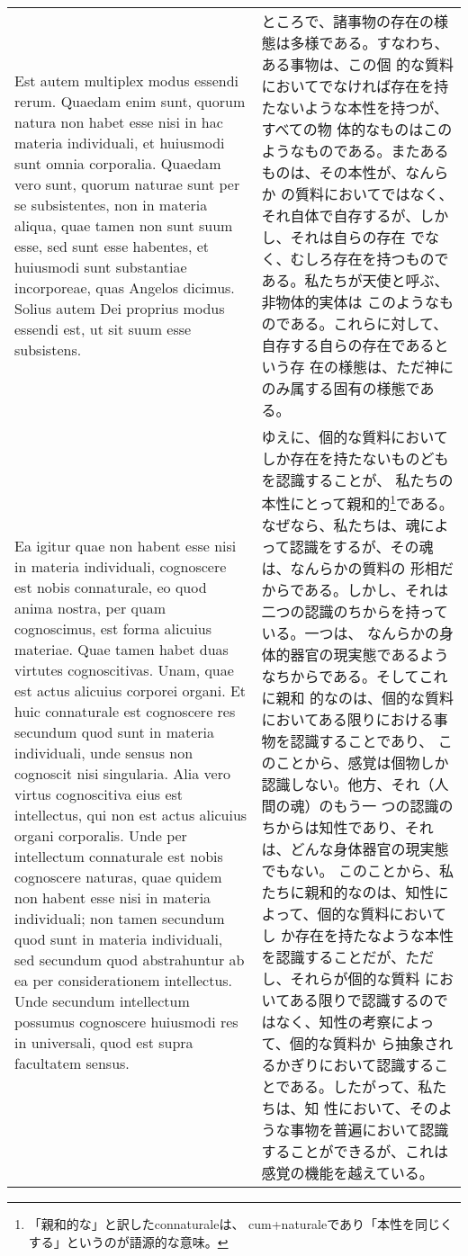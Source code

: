 \documentclass[10pt]{jsarticle} %
\begin{document}
\begin{longtable}{p{21em}p{21em}}
\\

Est autem multiplex modus essendi rerum. Quaedam enim sunt, quorum
natura non habet esse nisi in hac materia individuali, et huiusmodi
sunt omnia corporalia. Quaedam vero sunt, quorum naturae sunt per se
subsistentes, non in materia aliqua, quae tamen non sunt suum esse,
sed sunt esse habentes, et huiusmodi sunt substantiae incorporeae,
quas Angelos dicimus. Solius autem Dei proprius modus essendi est, ut
sit suum esse subsistens.

&

ところで、諸事物の存在の様態は多様である。すなわち、ある事物は、この個
的な質料においてでなければ存在を持たないような本性を持つが、すべての物
体的なものはこのようなものである。またあるものは、その本性が、なんらか
の質料においてではなく、それ自体で自存するが、しかし、それは自らの存在
でなく、むしろ存在を持つものである。私たちが天使と呼ぶ、非物体的実体は
このようなものである。これらに対して、自存する自らの存在であるという存
在の様態は、ただ神にのみ属する固有の様態である。

\\

Ea igitur quae non habent esse nisi in materia individuali, cognoscere
est nobis connaturale, eo quod anima nostra, per quam cognoscimus, est
forma alicuius materiae. Quae tamen habet duas virtutes
cognoscitivas. Unam, quae est actus alicuius corporei organi. Et huic
connaturale est cognoscere res secundum quod sunt in materia
individuali, unde sensus non cognoscit nisi singularia. Alia vero
virtus cognoscitiva eius est intellectus, qui non est actus alicuius
organi corporalis. Unde per intellectum connaturale est nobis
cognoscere naturas, quae quidem non habent esse nisi in materia
individuali; non tamen secundum quod sunt in materia individuali, sed
secundum quod abstrahuntur ab ea per considerationem intellectus. Unde
secundum intellectum possumus cognoscere huiusmodi res in universali,
quod est supra facultatem sensus. 

&

ゆえに、個的な質料においてしか存在を持たないものどもを認識することが、
私たちの本性にとって親和的\footnote{「親和的な」と訳したconnaturaleは、
cum+naturaleであり「本性を同じくする」というのが語源的な意味。}である。
なぜなら、私たちは、魂によって認識をするが、その魂は、なんらかの質料の
形相だからである。しかし、それは二つの認識のちからを持っている。一つは、
なんらかの身体的器官の現実態であるようなちからである。そしてこれに親和
的なのは、個的な質料においてある限りにおける事物を認識することであり、
このことから、感覚は個物しか認識しない。他方、それ（人間の魂）のもう一
つの認識のちからは知性であり、それは、どんな身体器官の現実態でもない。
このことから、私たちに親和的なのは、知性によって、個的な質料においてし
か存在を持たなような本性を認識することだが、ただし、それらが個的な質料
においてある限りで認識するのではなく、知性の考察によって、個的な質料か
ら抽象されるかぎりにおいて認識することである。したがって、私たちは、知
性において、そのような事物を普遍において認識することができるが、これは
感覚の機能を越えている。


\end{longtable}
\end{document}
